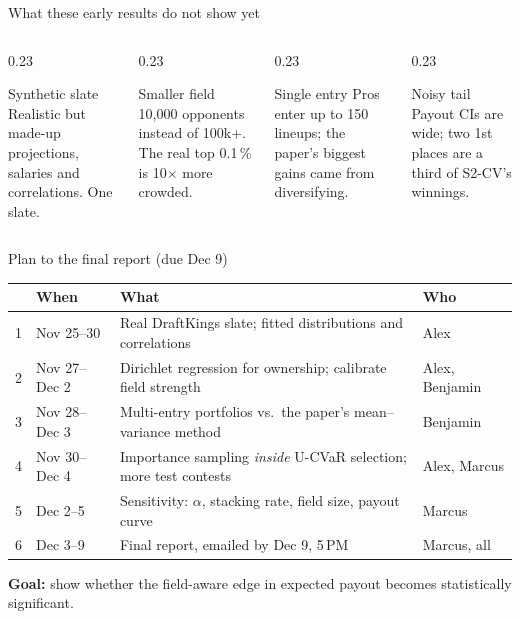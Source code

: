 \begin{frame}{What these early results do not show yet}
  \begin{columns}[t]
    \begin{column}{0.23\textwidth}
      \begin{block}{Synthetic slate}
        Realistic but made-up projections, salaries and correlations. One slate.
      \end{block}
    \end{column}
    \begin{column}{0.23\textwidth}
      \begin{block}{Smaller field}
        10{,}000 opponents instead of 100k+. The real top 0.1\,\% is 10$\times$ more
        crowded.
      \end{block}
    \end{column}
    \begin{column}{0.23\textwidth}
      \begin{block}{Single entry}
        Pros enter up to 150 lineups; the paper's biggest gains came from diversifying.
      \end{block}
    \end{column}
    \begin{column}{0.23\textwidth}
      \begin{block}{Noisy tail}
        Payout CIs are wide; two 1st places are a third of S2-CV's winnings.
      \end{block}
    \end{column}
  \end{columns}
\end{frame}

\begin{frame}{Plan to the final report (due Dec 9)}
  \centering
  \begin{tabular}{@{}llp{}l@{}}
    \toprule
    & When & What & Who \\
    \midrule
    1 & Nov 25--30 & Real DraftKings slate; fitted distributions and correlations & Alex \\
    2 & Nov 27--Dec 2 & Dirichlet regression for ownership; calibrate field strength & Alex, Benjamin \\
    3 & Nov 28--Dec 3 & Multi-entry portfolios vs.\ the paper's mean--variance method & Benjamin \\
    4 & Nov 30--Dec 4 & Importance sampling \emph{inside} U-CVaR selection; more test contests & Alex, Marcus \\
    5 & Dec 2--5 & Sensitivity: $\alpha$, stacking rate, field size, payout curve & Marcus \\
    6 & Dec 3--9 & Final report, emailed by Dec 9, 5\,PM & Marcus, all \\
    \bottomrule
  \end{tabular}
  \vspace{1em}

  \textbf{Goal:} show whether the field-aware edge in expected payout becomes statistically
  significant.
\end{frame}

